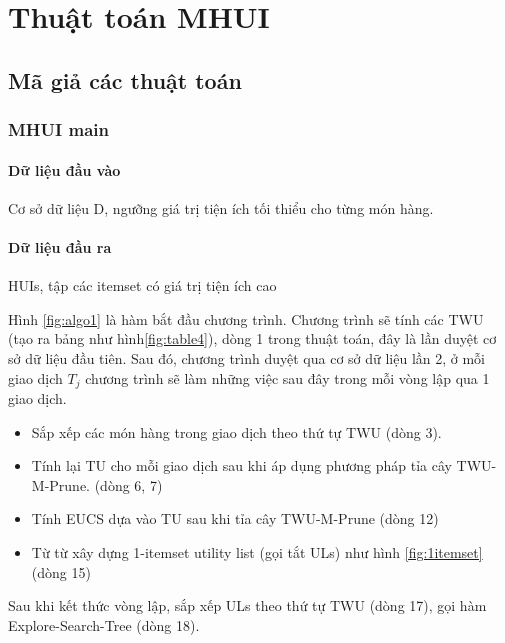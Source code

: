 \section{Thuật toán MHUI}

\subsection{Mã giả các thuật toán}

\subsubsection{MHUI main}

\paragraph{Dữ liệu đầu vào} Cơ sở dữ liệu D, ngưỡng giá trị tiện ích tối thiểu cho từng món hàng.  

\paragraph{Dữ liệu đầu ra} HUIs, tập các itemset có giá trị tiện ích cao

Hình \ref{fig:algo1} là hàm bắt đầu chương trình. Chương trình sẽ tính các TWU (tạo ra bảng như hình\ref{fig:table4}), dòng 1 trong thuật toán, đây là lần duyệt cơ sở dữ liệu đầu tiên. Sau đó, chương trình duyệt qua cơ sở dữ liệu lần 2, ở mỗi giao dịch $T_j$ chương trình sẽ làm những việc sau đây trong mỗi vòng lập qua 1 giao dịch.

\begin{itemize}
  \item Sắp xếp các món hàng trong giao dịch theo thứ tự TWU (dòng 3). 
  \item Tính lại TU cho mỗi giao dịch sau khi áp dụng phương pháp tỉa cây TWU-M-Prune. (dòng 6, 7)
  \item Tính EUCS dựa vào TU sau khi tỉa cây TWU-M-Prune (dòng 12)
  \item Từ từ xây dựng 1-itemset utility list (gọi tắt ULs) như hình \ref{fig:1itemset} (dòng 15) 
\end{itemize}

Sau khi kết thức vòng lập, sắp xếp ULs theo thứ tự TWU (dòng 17), gọi hàm Explore-Search-Tree (dòng 18). 

